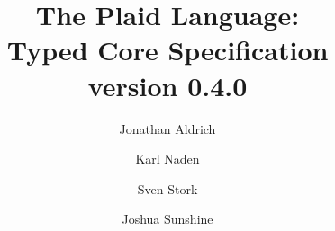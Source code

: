 \documentclass[12pt]{article}
\title{The Plaid Language:\\
Typed Core Specification\\
\vspace{2ex}
version 0.4.0\\
\vspace{2ex}
}
\author{Jonathan Aldrich \and Karl Naden \and Sven Stork \and Joshua Sunshine}
\date{\monthname~\the \year}
\begin{document}
\renewcommand*{\thepage}{title-\arabic{page}} 
\maketitle
\renewcommand*{\thepage}{\arabic{page}} 















\end{document}
